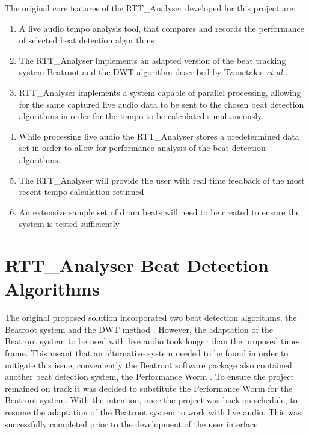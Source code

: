 \documentclass[a4paper, 11pt]{article}
\begin{document}
The original core features of the RTT\_Analyser developed for this project are:

\begin{enumerate}
\item A live audio tempo analysis tool, that compares and records the performance of selected beat detection algorithms
\item The RTT\_Analyser implements an adapted version of the beat tracking system Beatroot and the DWT algorithm described by Tzanetakis \textit{et al} \cite{tzane1}.
\item RTT\_Analyser implements a system capable of parallel processing, allowing for the same captured live audio data to be sent to the chosen beat detection algorithms in order for the tempo to be calculated simultaneously.
\item While processing live audio the RTT\_Analyser stores a predetermined data set in order to allow for performance analysis of the beat detection algorithms.
\item The RTT\_Analyser will provide the user with real time feedback of the most recent tempo calculation returned
\item An extensive sample set of drum beats will need to be created to ensure the system is tested sufficiently
\end{enumerate}



\maketitle{}\section{RTT\_Analyser Beat Detection Algorithms}
The original proposed solution incorporated two beat detection algorithms, the Beatroot system \cite{dixon1} and the DWT method \cite{tzane1}. However, the adaptation of the Beatroot system to be used with live audio took longer than the proposed time-frame. This meant that an alternative system needed to be found in order to mitigate this issue, conveniently the Beatroot software package also contained another beat detection system, the Performance Worm \cite{dixon3}. To ensure the project remained on track it was decided to substitute the Performance Worm for the Beatroot system. With the intention, once the project was back on schedule, to resume the adaptation of the Beatroot system to work with live audio. This was successfully completed prior to the development of the user interface.
\end{document}
